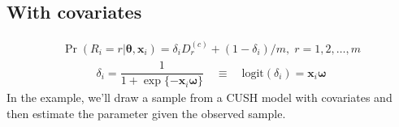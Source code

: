\documentclass[letterpaper,10pt,english]{sphinxmanual}
\begin{document}
\subsection{With covariates}
\label{\detokenize{manual:cush-with-covariates}}\label{\detokenize{manual:id23}}
\sphinxAtStartPar
{}
\begin{equation*}
\begin{split}\Pr(R_i=r|\pmb\theta,\pmb x_i) = \delta_i D_r^{(c)} + (1-\delta_i)/m
,\; r=1,2,\ldots,m\end{split}
\end{equation*}\begin{equation*}
\begin{split}\delta_i = \dfrac{1}{1+\exp\{ - \pmb x_i \pmb\omega \}}
\quad \equiv \quad
\mathrm{logit}(\delta_i) = \pmb x_i \pmb\omega\end{split}
\end{equation*}
\sphinxAtStartPar
In the example, we’ll draw a sample from a CUSH model with covariates and
then estimate the parameter given the observed sample.
\end{document}
